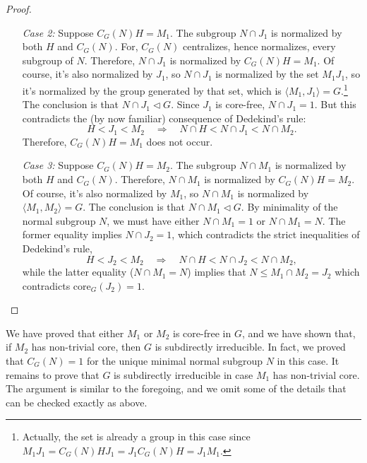 \documentclass[cm,dissertation]{uhthesis}
\theoremstyle{plain}
\theoremstyle{definition}
\theoremstyle{remark}
\numberwithin{theorem}{section}
\numberwithin{claim}{chapter}
\numberwithin{equation}{section}
\numberwithin{conjecture}{chapter}
\newcommand{\<}{\ensuremath{\langle}}
\renewcommand{\>}{\ensuremath{\rangle}}
\renewcommand{\leq}{\ensuremath{\leqslant}}
\newcommand{\ssubnormal}{\ensuremath{\vartriangleleft}}
\newcommand{\core}{\ensuremath{\mathrm{core}}}
\newcommand{\0}{\ensuremath{\mathbf{0}}}
\newcommand{\1}{\ensuremath{\mathbf{1}}}
\newcommand{\2}{\ensuremath{\mathbf{2}}}
\newcommand{\3}{\ensuremath{\mathbf{3}}}
\newcommand{\4}{\ensuremath{\mathbf{4}}}
\newcommand{\5}{\ensuremath{\mathbf{5}}}
\begin{document}
\begin{proof}
\begin{enumerate}
\item[{\it Case 2:}]
Suppose $C_G(N)H =M_1$.  The subgroup $N\cap J_1$ is
normalized by both $H$ and $C_G(N)$. For, $C_G(N)$ centralizes, hence
normalizes, every subgroup of $N$.  Therefore, $N\cap J_1$ is normalized by 
$C_G(N)H =M_1$.  Of course, it's also normalized by $J_1$, so
$N\cap J_1$ is normalized by the set $M_1J_1$, so it's normalized by the group
generated by that set, which is $\<M_1, J_1\> = G$.\footnote{Actually, the set is
already a group in this case since $M_1J_1 = C_G(N)H J_1 = J_1 C_G(N)H = J_1 M_1$.}
The conclusion is that $N\cap J_1\ssubnormal G$.  
Since $J_1$ is core-free, $N\cap J_1 = 1$.
But this contradicts the (by now familiar) consequence of
Dedekind's rule:  
\[
H < J_1 < M_2  \quad \Rightarrow \quad N\cap H < N\cap J_1 < N\cap M_2.
\]
 Therefore, $C_G(N)H =M_1$ does not occur.

\item[{\it Case 3:}]
Suppose $C_G(N)H = M_2$.
The subgroup $N\cap M_1$ is
normalized by both $H$ and $C_G(N)$.  Therefore, $N\cap M_1$ is normalized by 
$C_G(N)H =M_2$.  Of course, it's also normalized by $M_1$, so
$N\cap M_1$ is normalized by $\<M_1, M_2\> = G$.
The conclusion is that $N\cap M_1\ssubnormal G$.  By 
minimality of the normal subgroup $N$, we must have either $N\cap M_1 = 1$ or 
$N\cap M_1 = N$.  The former equality implies $N\cap J_2=1$, which contradicts 
the strict inequalities of Dedekind's rule,
\begin{equation}
  \label{eq:6}
H < J_2 < M_2  \quad \Rightarrow \quad N\cap H < N\cap J_2 < N\cap M_2,
\end{equation}
while the latter equality ($N\cap M_1 = N$) implies that $N \leq M_1 \cap M_2 = J_2$ which
contradicts 
$\core_G(J_2)=1$. 
\end{enumerate}
\end{proof}

We have proved that either $M_1$ or $M_2$ is core-free in $G$, and
we have shown that, if $M_2$ has non-trivial core, then $G$ is subdirectly
irreducible.  In fact, we proved that $C_G(N)=1$ for the unique minimal normal subgroup
$N$ in this case.  It remains to prove that $G$ is subdirectly irreducible in
case $M_1$ has non-trivial core. The argument is similar to the foregoing, and
we omit some of the details that can be checked exactly as above.
\end{document}
